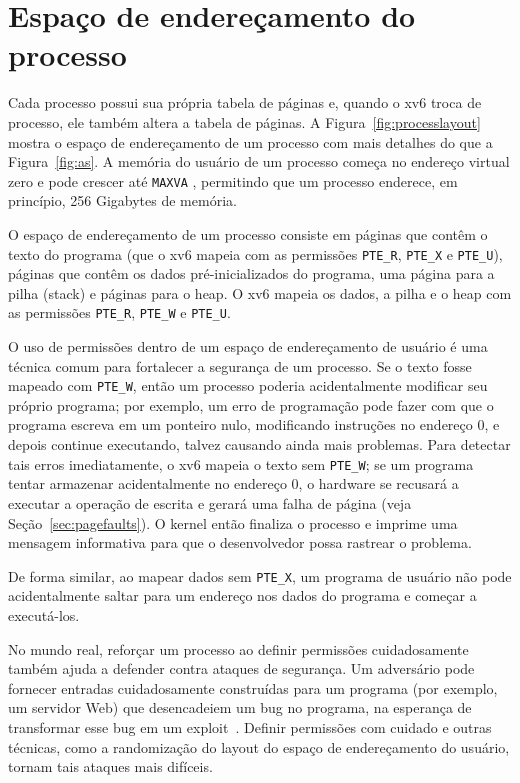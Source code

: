 \section{Espaço de endereçamento do processo}

Cada processo possui sua própria tabela de páginas e, quando o xv6 troca de processo, ele também altera a tabela de páginas.  
A Figura~\ref{fig:processlayout} mostra o espaço de endereçamento de um processo com mais detalhes do que a Figura~\ref{fig:as}.  
A memória do usuário de um processo começa no endereço virtual zero e pode crescer até \texttt{MAXVA}
, permitindo que um processo enderece, em princípio, 256 Gigabytes de memória.

O espaço de endereçamento de um processo consiste em páginas que contêm o texto do programa (que o xv6 mapeia com as permissões \lstinline{PTE_R}, \lstinline{PTE_X} e \lstinline{PTE_U}), páginas que contêm os dados pré-inicializados do programa, uma página para a pilha (stack) e páginas para o heap.  
O xv6 mapeia os dados, a pilha e o heap com as permissões \lstinline{PTE_R}, \lstinline{PTE_W} e \lstinline{PTE_U}.

O uso de permissões dentro de um espaço de endereçamento de usuário é uma técnica comum para fortalecer a segurança de um processo.  
Se o texto fosse mapeado com \lstinline{PTE_W}, então um processo poderia acidentalmente modificar seu próprio programa; por exemplo, um erro de programação pode fazer com que o programa escreva em 
um ponteiro nulo, modificando instruções no endereço 0, e depois continue executando, talvez causando ainda mais problemas.  
Para detectar tais erros imediatamente, o xv6 mapeia o texto sem \lstinline{PTE_W}; se um programa tentar armazenar acidentalmente no endereço 0, o hardware se recusará a executar a operação de 
escrita e gerará uma falha de página (veja Seção~\ref{sec:pagefaults}).  
O kernel então finaliza o processo e imprime uma mensagem informativa para que o desenvolvedor possa rastrear o problema.

De forma similar, ao mapear dados sem \lstinline{PTE_X}, um programa de usuário não pode acidentalmente saltar para um endereço nos dados do programa e começar a executá-los.

No mundo real, reforçar um processo ao definir permissões cuidadosamente também ajuda a defender contra ataques de segurança.  
Um adversário pode fornecer entradas cuidadosamente construídas para um programa (por exemplo, um servidor Web) que desencadeiem um bug no programa, na esperança de transformar esse bug em um 
exploit~\cite{aleph:smashing}.  
Definir permissões com cuidado e outras técnicas, como a randomização do layout do espaço de endereçamento do usuário, tornam tais ataques mais difíceis.

